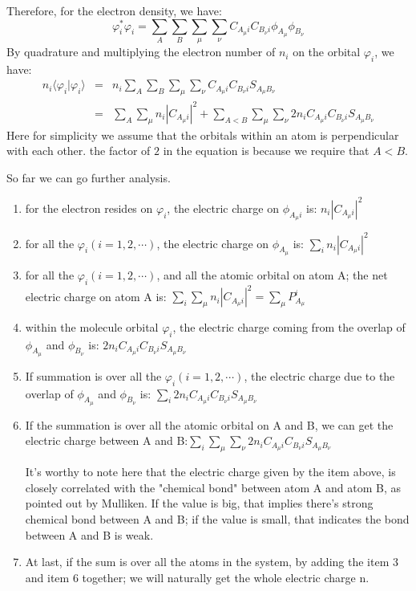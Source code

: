 Therefore, for the electron density, we have:
\begin{equation}\label{}
\varphi^{*}_{i}\varphi_{i} =
\sum_{A}\sum_{B}\sum_{\mu}\sum_{\nu}C_{A_{\mu}i}C_{B_{\nu}i}\phi_{A_{\mu}}
\phi_{B_{\nu}}
\end{equation}
By quadrature and multiplying the electron number of $n_{i}$ on the
orbital $\varphi_{i}$, we have:
\begin{eqnarray}
  n_{i}\langle \varphi_{i}|\varphi_{i} \rangle &=& n_{i}\sum_{A}\sum_{B}\sum_{\mu}\sum_{\nu}C_{A_{\mu}i}C_{B_{\nu}i}
S_{A_{\mu}B_{\nu}} \nonumber \\
   &=& \sum_{A}\sum_{\mu}n_{i}\left| C_{A_{\mu}i} \right|^{2} + \sum_{A<B}\sum_{\mu}\sum_{\nu}2n_{i}C_{A_{\mu}i}C_{B_{\nu}i}
S_{A_{\mu}B_{\nu}}
\end{eqnarray}
Here for simplicity we assume that the orbitals within an atom is
perpendicular with each other. the factor of $2$ in the equation is
because we require that $A<B$.

So far we can go further analysis.
\begin{enumerate}
  \item for the electron resides on $\varphi_{i}$, the electric
  charge on $\phi_{A_{\mu}i}$ is: $n_{i}\left| C_{A_{\mu}i} \right|^{2}$
  \item for all the $\varphi_{i} (i=1,2, \cdots)$, the electric
  charge on $\phi_{A_{\mu}}$ is: $\sum_{i}n_{i}\left| C_{A_{\mu}i} \right|^{2}$
  \item for all the $\varphi_{i} (i=1,2, \cdots)$, and all the atomic orbital on atom A;
  the net electric charge on atom A is: $\sum_{i}\sum_{\mu}n_{i}\left| C_{A_{\mu}i}
\right|^{2} = \sum_{\mu}P^{i}_{A_{\mu}}$
  \item within the molecule orbital $\varphi_{i}$, the electric
  charge coming from the overlap of $\phi_{A_{\mu}}$ and
  $\phi_{B_{\nu}}$ is: $2n_{i}C_{A_{\mu}i}C_{B_{\nu}i}
S_{A_{\mu}B_{\nu}}$
  \item If summation is over all the $\varphi_{i} (i=1,2, \cdots)$,
  the electric charge due to the overlap of $\phi_{A_{\mu}}$ and
  $\phi_{B_{\nu}}$ is: $\sum_{i}2n_{i}C_{A_{\mu}i}C_{B_{\nu}i}
S_{A_{\mu}B_{\nu}}$
  \item If the summation is over all the atomic orbital on A and B,
  we can get the electric charge between A and B:$\sum_{i}\sum_{\mu}\sum_{\nu}2n_{i}C_{A_{\mu}i}C_{B_{\nu}i}
S_{A_{\mu}B_{\nu}}$

It's worthy to note here that the electric charge given by the item
above, is closely correlated with the "chemical bond" between atom A
and atom B, as pointed out by Mulliken. If the value is big, that
implies there's strong chemical bond between A and B; if the value
is small, that indicates the bond between A and B is weak.
  \item At last, if the sum is over all the atoms in the system, by
  adding the item 3 and item 6 together; we will naturally get the whole
  electric charge n.
\end{enumerate}

